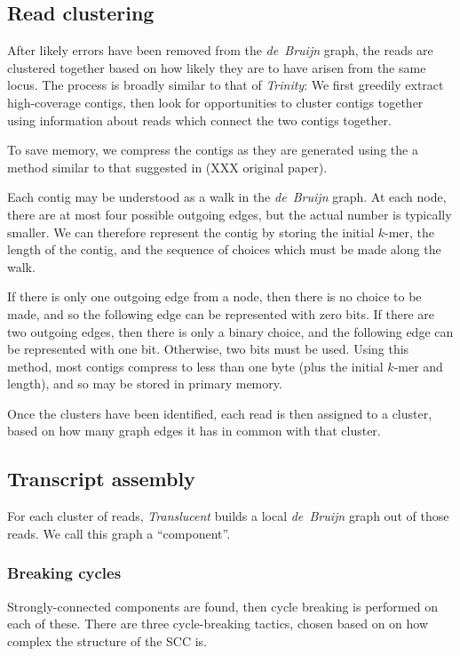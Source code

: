 \documentclass{bioinfo}
\def\Translucent{\textit{Translucent}}
\def\Trinity{\textit{Trinity}}
\def\debruijn{\textit{de~Bruijn}}
\def\kmer{$k$-mer}
\begin{document}
\subsection{Read clustering}

After likely errors have been removed from the \debruijn{} graph,
the reads are clustered together based on how likely they are to
have arisen from the same locus.
The process is broadly similar to that of \Trinity{}:
We first greedily extract high-coverage contigs, then look for opportunities
to cluster contigs together using information about reads which connect
the two contigs together.

To save memory, we compress the contigs as they are generated using
the a method similar to that suggested in (XXX original paper).

Each contig may be understood as a walk in the \debruijn{} graph.
At each node, there are at most four possible outgoing edges, but
the actual number is typically smaller.
We can therefore represent the contig by storing the initial
\kmer{}, the length of the contig, and the sequence of choices
which must be made along the walk.

If there is only one outgoing edge from a node, then there is
no choice to be made, and so the following edge can be represented
with zero bits.
If there are two outgoing edges, then there is only a binary choice,
and the following edge can be represented with one bit.
Otherwise, two bits must be used.
Using this method, most contigs compress to less than one byte
(plus the initial \kmer{} and length), and so may be stored in
primary memory.

Once the clusters have been identified, each read is then assigned
to a cluster, based on how many graph edges it has in common with
that cluster.

\subsection{Transcript assembly}

For each cluster of reads, \Translucent{} builds a local \debruijn{} graph
out of those reads.
We call this graph a ``component''.

\subsubsection{Breaking cycles}

Strongly-connected components are found, then cycle breaking is
performed on each of these.
There are three cycle-breaking tactics, chosen based on
on how complex the structure of the SCC is.
\end{document}
